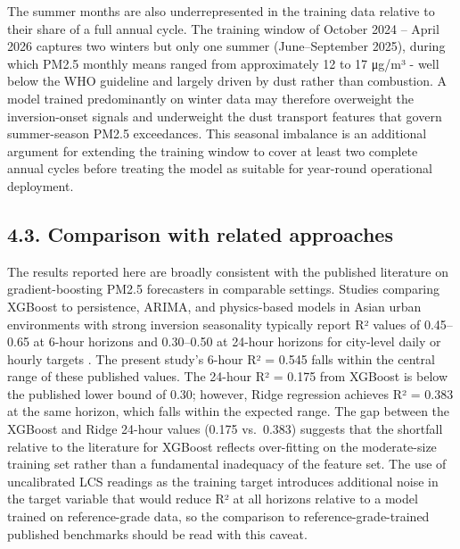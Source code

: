 The summer months are also underrepresented in the training data relative to their share of a full annual cycle. The training window of October 2024 -- April 2026 captures two winters but only one summer (June--September 2025), during which PM2.5 monthly means ranged from approximately 12 to 17 μg/m³ - well below the WHO guideline and largely driven by dust rather than combustion. A model trained predominantly on winter data may therefore overweight the inversion-onset signals and underweight the dust transport features that govern summer-season PM2.5 exceedances. This seasonal imbalance is an additional argument for extending the training window to cover at least two complete annual cycles before treating the model as suitable for year-round operational deployment.

\subsection{4.3. Comparison with related approaches}\label{comparison-with-related-approaches}

The results reported here are broadly consistent with the published literature on gradient-boosting PM2.5 forecasters in comparable settings. Studies comparing XGBoost to persistence, ARIMA, and physics-based models in Asian urban environments with strong inversion seasonality typically report R² values of 0.45--0.65 at 6-hour horizons and 0.30--0.50 at 24-hour horizons for city-level daily or hourly targets \cite{enebish2021ulaanbaatar, qi2019pm25lstm}. The present study's 6-hour R² = 0.545 falls within the central range of these published values. The 24-hour R² = 0.175 from XGBoost is below the published lower bound of 0.30; however, Ridge regression achieves R² = 0.383 at the same horizon, which falls within the expected range. The gap between the XGBoost and Ridge 24-hour values (0.175 vs.~0.383) suggests that the shortfall relative to the literature for XGBoost reflects over-fitting on the moderate-size training set rather than a fundamental inadequacy of the feature set. The use of uncalibrated LCS readings as the training target introduces additional noise in the target variable that would reduce R² at all horizons relative to a model trained on reference-grade data, so the comparison to reference-grade-trained published benchmarks should be read with this caveat.

